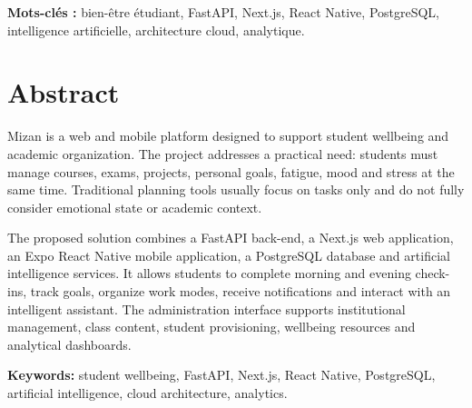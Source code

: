 \documentclass{rapportENSET}
\begin{document}
\textbf{Mots-clés :} bien-être étudiant, FastAPI, Next.js, React Native, PostgreSQL, intelligence artificielle, architecture cloud, analytique.

\section*{Abstract}
Mizan is a web and mobile platform designed to support student wellbeing and academic organization. The project addresses a practical need: students must manage courses, exams, projects, personal goals, fatigue, mood and stress at the same time. Traditional planning tools usually focus on tasks only and do not fully consider emotional state or academic context.

The proposed solution combines a FastAPI back-end, a Next.js web application, an Expo React Native mobile application, a PostgreSQL database and artificial intelligence services. It allows students to complete morning and evening check-ins, track goals, organize work modes, receive notifications and interact with an intelligent assistant. The administration interface supports institutional management, class content, student provisioning, wellbeing resources and analytical dashboards.

\textbf{Keywords:} student wellbeing, FastAPI, Next.js, React Native, PostgreSQL, artificial intelligence, cloud architecture, analytics.

\newpage
\tabledematieres
\listoffigures
\listoftables
\newpage
\end{document}
